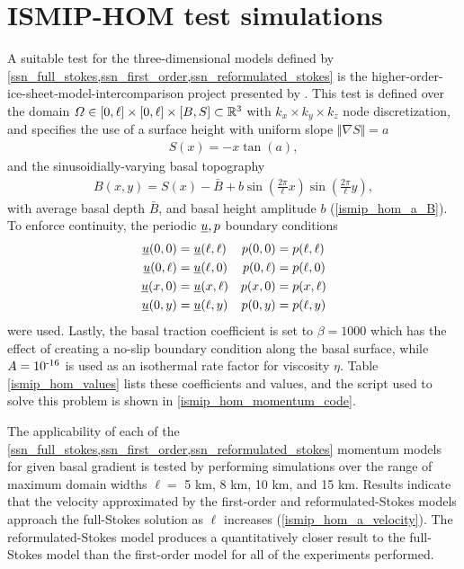 \section{ISMIP-HOM test simulations} \label{ssn_ismip_hom_test_simulations}

A suitable test for the three-dimensional models defined by \cref{ssn_full_stokes,ssn_first_order,ssn_reformulated_stokes} is the higher-order-ice-sheet-model-intercomparison project presented by \citet{pattyn_2008}.  This test is defined over the domain $\varOmega \in [0,\ell] \times [0,\ell] \times [B,S] \subset \mathbb{R}^3$ with $k_x \times k_y \times k_z$ node discretization, and specifies the use of a surface height with uniform slope $\Vert \nabla S \Vert = a$
\begin{align*}
  S(x) = - x \tan\left( a \right),
\end{align*}
and the sinusoidially-varying basal topography
\begin{align*}
  B(x,y) = S(x) - \bar{B} + b \sin\left( \frac{2 \pi}{\ell} x \right) \sin\left( \frac{2 \pi}{\ell} y \right),
\end{align*}
with average basal depth $\bar{B}$, and basal height amplitude $b$ (\cref{ismip_hom_a_B}).  To enforce continuity, the periodic $\underline{u},p$ boundary conditions
\begin{align*}
  \underline{u}(0,0)    &= \underline{u}(\ell,\ell) & p(0,0)    &= p(\ell,\ell)\\
  \underline{u}(0,\ell) &= \underline{u}(\ell,0)    & p(0,\ell) &= p(\ell,0)   \\
  \underline{u}(x,0)    &= \underline{u}(x,\ell)    & p(x,0)    &= p(x,\ell)   \\
  \underline{u}(0,y)    &= \underline{u}(\ell,y)    & p(0,y)    &= p(\ell,y)
\end{align*}
were used.  Lastly, the basal traction coefficient is set to $\beta = 1000$ which has the effect of creating a no-slip boundary condition along the basal surface, while $A = 10^{\textrm{-16}}$ is used as an isothermal rate factor for viscosity $\eta$.  Table \cref{ismip_hom_values} lists these coefficients and values, and the \CSLVR script used to solve this problem is shown in \cref{ismip_hom_momentum_code}.

The applicability of each of the \cref{ssn_full_stokes,ssn_first_order,ssn_reformulated_stokes} momentum models for given basal gradient is tested by performing simulations over the range of maximum domain widths $\ell = $ 5 km, 8 km, 10 km, and 15 km.  Results indicate that the velocity approximated by the first-order and reformulated-Stokes models approach the full-Stokes solution as $\ell$ increases (\cref{ismip_hom_a_velocity}).  The reformulated-Stokes model produces a quantitatively closer result to the full-Stokes model than the first-order model for all of the experiments performed.

